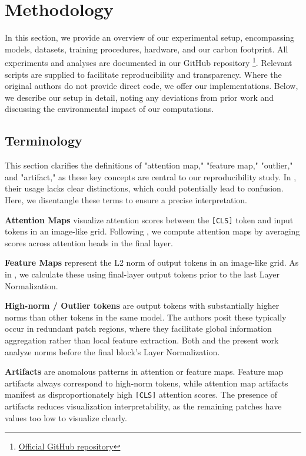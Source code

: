 \documentclass[10pt]{article} \usepackage[preprint]{tmlr}
\begin{document}
\section{Methodology}
In this section, we provide an overview of our experimental setup, encompassing models, datasets, training procedures, hardware, and our carbon footprint. All experiments and analyses are documented in our GitHub repository \footnote{\href{https://anonymous.4open.science/r/VitReg-4C8B/}{Official GitHub repository}}. Relevant scripts are supplied to facilitate reproducibility and transparency. Where the original authors do not provide direct code, we offer our implementations. Below, we describe our setup in detail, noting any deviations from prior work and discussing the environmental impact of our computations.

\subsection{Terminology}
This section clarifies the definitions of "attention map," "feature map," "outlier," and "artifact," as these key concepts are central to our reproducibility study. In \citet{darcet2024registers}, their usage lacks clear distinctions, which could potentially lead to confusion.
Here, we disentangle these terms to ensure a precise interpretation.

\textbf{Attention Maps} visualize attention scores between the \texttt{[CLS]} token and input tokens in an image-like grid. Following \citet{darcet2024registers}, we compute attention maps by averaging scores across attention heads in the final layer.

\textbf{Feature Maps} represent the L2 norm of output tokens in an image-like grid. As in \citet{darcet2024registers}, we calculate these using final-layer output tokens prior to the last Layer Normalization.

\textbf{High-norm / Outlier tokens} are output tokens with substantially higher norms than other tokens in the same model. The authors posit these typically occur in redundant patch regions, where they facilitate global information aggregation rather than local feature extraction. Both \citet{darcet2024registers} and the present work analyze norms before the final block's Layer Normalization.

\textbf{Artifacts} are anomalous patterns in attention or feature maps. Feature map artifacts always correspond to high-norm tokens, while attention map artifacts manifest as disproportionately high \texttt{[CLS]} attention scores. The presence of artifacts reduces visualization interpretability, as the remaining patches have values too low to visualize clearly.
\end{document}
